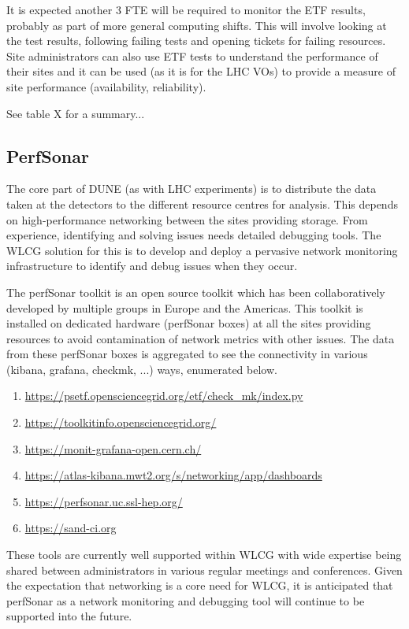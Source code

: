 \documentclass[../main-v1.tex]{subfiles}
\begin{document}
It is expected another 3 FTE will be required to monitor the ETF results, probably as part of more general computing shifts. This will involve looking at the test results, following failing tests and opening tickets for failing resources. Site administrators can also use ETF tests to understand the performance of their sites and it can be used (as it is for the LHC VOs) to provide a measure of site performance (availability, reliability).

See table X for a summary... 

\subsection{PerfSonar}

The core part of DUNE (as with LHC experiments) is to distribute the data taken at the detectors to the different resource centres for analysis. This depends on high-performance networking between the sites providing storage. From experience, identifying and solving issues needs detailed debugging tools. The WLCG solution for this is to develop and deploy a pervasive network monitoring infrastructure to identify and debug issues when they occur.

The perfSonar toolkit is an open source toolkit which has been collaboratively developed by multiple groups in Europe and the Americas. This toolkit is installed on dedicated hardware (perfSonar boxes) at all the sites providing resources to avoid contamination of network metrics with other issues. The data from these perfSonar boxes is aggregated to see the connectivity in various (kibana, grafana, checkmk, ...) ways, enumerated below.

\begin{enumerate}
    \item \url{https://psetf.opensciencegrid.org/etf/check_mk/index.py}
    \item \url{https://toolkitinfo.opensciencegrid.org/}
    \item \url{https://monit-grafana-open.cern.ch/}
    \item \url{https://atlas-kibana.mwt2.org/s/networking/app/dashboards}
    \item \url{https://perfsonar.uc.ssl-hep.org/}
    \item \url{https://sand-ci.org}
\end{enumerate}

These tools are currently well supported within WLCG with wide expertise being shared between administrators in various regular meetings and conferences. Given the expectation that networking is a core need for WLCG, it is anticipated that perfSonar as a network monitoring and debugging tool will continue to be supported into the future.
\end{document}
